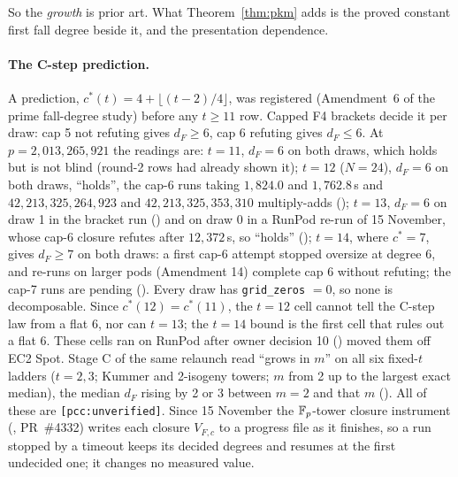 \begin{table}[t]
\centering\small

\caption[]{Prime-field Kummer tower, $m=2$, factor base $\mu_{2^t}$:
the proved first fall degree (Theorem~\ref{thm:pkm}(3); it needs $t\ge2$),
the session-reported median last fall degree at $p=2{,}013{,}265{,}921$
(raw data not committed), and the corrected degree of regularity
$D_{\rm reg}^{\rm corr}$ of Petit, Kosters and Messeng, Table~4
(prime case)~\cite{pkm2016}. Source: , from
.}
\label{tab:fd-pkm}
\end{table} So the \emph{growth} is prior art. What
Theorem~\ref{thm:pkm} adds is the proved constant first fall degree beside
it, and the presentation dependence.

\paragraph{The C-step prediction.} A prediction,
$c^*(t)=4+\lfloor(t-2)/4\rfloor$, was registered (Amendment~6 of the
prime fall-degree study) before any $t\ge11$ row. Capped F4 brackets
decide it per draw: cap 5 not refuting gives $d_F\ge6$, cap 6 refuting
gives $d_F\le6$. At $p=2{,}013{,}265{,}921$ the readings are: $t=11$, $d_F=6$
on both draws, which holds but is not blind (round-2 rows had already
shown it); $t=12$ ($N=24$), $d_F=6$ on both draws, ``holds'', the cap-6 runs
taking $1{,}824.0$ and $1{,}762.8$\,s and $42{,}213{,}325{,}264{,}923$ and
$42{,}213{,}325{,}353{,}310$ multiply-adds
(); $t=13$,
$d_F=6$ on draw 1 in the bracket run
() and
on draw 0 in a RunPod re-run of 15 November, whose cap-6 closure refutes
after $12{,}372$\,s, so ``holds''
();
$t=14$, where $c^*=7$, gives $d_F\ge7$ on both draws: a first cap-6 attempt
stopped oversize at degree 6, and re-runs on larger pods (Amendment 14)
complete cap 6 without refuting; the cap-7 runs are pending
(). Every draw has \texttt{grid\_zeros}
$=0$, so none is decomposable. Since $c^*(12)=c^*(11)$, the $t=12$ cell
cannot tell the C-step law from a flat 6, nor can $t=13$; the $t=14$ bound
is the first cell that rules out a flat 6. These cells ran on RunPod after
owner decision 10 () moved
them off EC2 Spot. Stage C
of the same relaunch read ``grows in $m$'' on all six fixed-$t$ ladders
($t=2,3$; Kummer and 2-isogeny towers; $m$ from 2 up to the largest exact
median), the median $d_F$ rising by 2 or 3 between $m=2$ and that $m$
(). All of
these are \texttt{[pcc:unverified]}. Since 15 November the $\mathbb{F}_p$-tower closure
instrument (, PR~\#4332) writes each
closure $V_{F,c}$ to a progress file as it finishes, so a run stopped by a
timeout keeps its decided degrees and resumes at the first undecided one;
it changes no measured value.


